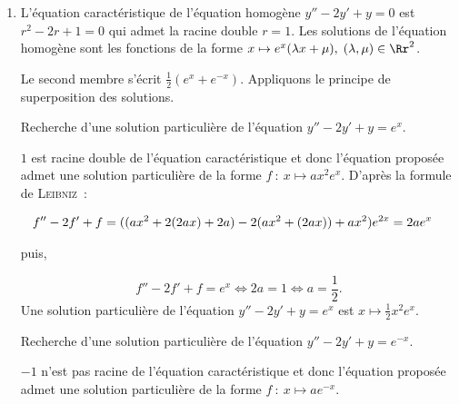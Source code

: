 {{\begin{enumerate}
$2$ n'est pas racine de l'équation caractéristique et donc
l'équation proposée admet une solution particulière de la forme $f~:~x\mapsto(ax^2+bx+c)e^{2x}$. D'après la formule
de \textsc{Leibniz}~:

\begin{align*}\ensuremath
f''+6f'+9f&=((4(ax^2+bx+c)+4(2ax+b)+2a)+6(2(ax^2+bx+c)+(2ax+b))+9(ax^2+bx+c))e^{2x}\\
 &=(25(ax^2+bx+c)+10(2ax+b)+2a)e^{2x}=(25ax^2+(20a+25b)x+2a+10b+25c)e^{2x}
\end{align*}

puis,

$$f''+6f'+9f=x^2e^{2x}\Leftrightarrow25a=1\;\mbox{et}\;20a+25b=0\;\mbox{et}\;2a+10b+25c=0\Leftrightarrow
a=\frac{1}{25}\;\mbox{et}\;b=-\frac{4}{125}\;\mbox{et}\;c=\frac{6}{625}.$$
Une solution particulière de l'équation $y''+6y'+9y=x^2e^{2x}$ est $x\mapsto\frac{1}{625}(25x^2-20x+6)e^{2x}$.

Les solutions sur $\Rr$ de l'équation proposée sont les fonctions de la forme
$x\mapsto\frac{1}{625}(25x^2-20x+6)e^{2x}+(\lambda x+\mu)e^{-3x}$, $(\lambda,\mu)\in\Rr^2$.

\item  L'équation caractéristique de l'équation homogène $y''-2y'+y=0$ est $r^2-2r+1=0$ qui admet la racine double
$r=1$. Les solutions de l'équation homogène sont les fonctions de la forme $x\mapsto
e^{x}(\lambda x+\mu),\;(\lambda,\mu)\in\Rr^2$.

Le second membre s'écrit $\frac{1}{2}(e^{x}+e^{-x})$. Appliquons le principe de superposition des solutions.

Recherche d'une solution particulière de l'équation $y''-2y'+y=e^{x}$.

$1$ est racine double de l'équation caractéristique et donc
l'équation proposée admet une solution particulière de la forme $f~:~x\mapsto ax^2e^{x}$. D'après la formule
de \textsc{Leibniz}~:

\begin{align*}\ensuremath
f''-2f'+f&=((ax^2+2(2ax)+2a)-2(ax^2+(2ax))+ax^2)e^{2x}=2ae^{x}
\end{align*}

puis,

$$f''-2f'+f=e^{x}\Leftrightarrow2a=1\Leftrightarrow a=\frac{1}{2}.$$
Une solution particulière de l'équation $y''-2y'+y=e^{x}$ est $x\mapsto\frac{1}{2}x^2e^{x}$.

Recherche d'une solution particulière de l'équation $y''-2y'+y=e^{-x}$.

$-1$ n'est pas racine de l'équation caractéristique et donc
l'équation proposée admet une solution particulière de la forme $f~:~x\mapsto ae^{-x}$.


\end{enumerate}}}
